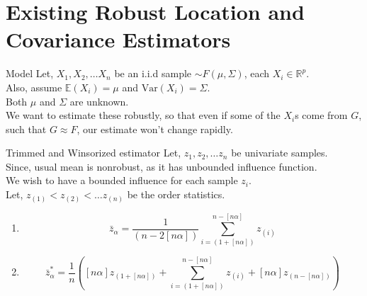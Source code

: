 \documentclass[10pt,xcolor=svgnames]{beamer} %
\newcommand{\R}{\mathbb{R}}
\newcommand{\E}{\mathbb{E}}
\newcommand{\var}{\text{Var}}
\begin{document}
\section{Existing Robust Location and Covariance Estimators}

\begin{frame}{Model}
    Let, $X_1, X_2, \dots X_n$ be an i.i.d sample $\sim F(\mu, \Sigma)$, each $X_i \in \R^p$.\\
    
    Also, assume $\E(X_i) = \mu$ and $\var(X_i) = \Sigma$.\\
    
    Both $\mu$ and $\Sigma$ are unknown.\\
    
    We want to estimate these robustly, so that even if some of the $X_i$s come from $G$, such that $G \approx F$, our estimate won't change rapidly.
\end{frame}

\begin{frame}{Trimmed and Winsorized estimator}
    Let, $z_1, z_2, \dots z_n$ be univariate samples.\\
    Since, usual mean is nonrobust, as it has unbounded influence function.\\
    We wish to have a bounded influence for each sample $z_i$.\\
    Let, $z_{(1)} < z_{(2)} < \dots z_{(n)}$ be the order statistics.
    \begin{enumerate}
        \item {} 
        \begin{equation*}
            \bar{z}_{\alpha} = \dfrac{1}{(n - 2[n\alpha])} \sum_{i=(1+[n\alpha ])}^{n-[n\alpha]} z_{(i)}
        \end{equation*}
        \pause
        \item {}
        \begin{equation*}
            \bar{z}_{\alpha}^\ast = \dfrac{1}{n} \left( [n\alpha] z_{(1+[n\alpha])} + \sum_{i=(1+[n\alpha ])}^{n-[n\alpha]} z_{(i)} + [n\alpha] z_{(n-[n\alpha])}  \right)
        \end{equation*}
    \end{enumerate}
\end{frame}
\end{document}
